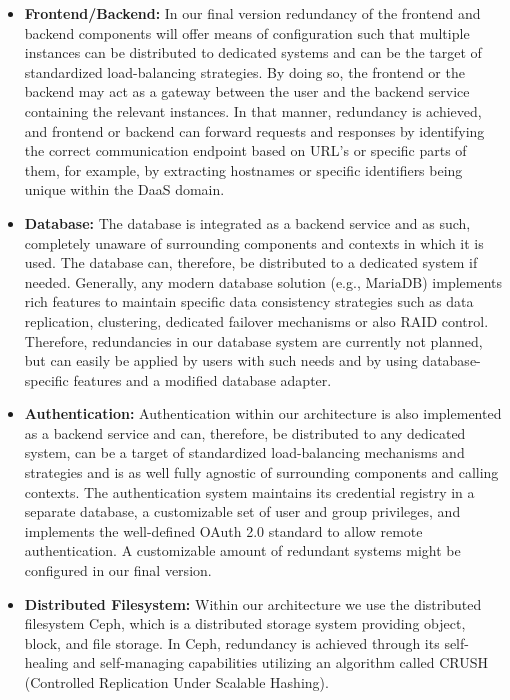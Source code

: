 \documentclass[runningheads]{llncs}
\begin{document}
\begin{itemize}
\item \textbf{Frontend/Backend:} In our final version
redundancy of the frontend and backend components will offer means of configuration
such that multiple instances can be distributed to dedicated systems
and can be the target of standardized load-balancing strategies.
By doing so, the frontend or the backend may act as a gateway
between the user and the backend service containing the relevant instances.
In that manner, redundancy is achieved, and frontend or backend
can forward requests and responses
by identifying the correct communication endpoint
based on URL's or specific parts of them,
for example, by extracting hostnames
or specific identifiers being unique within the DaaS domain.
\item \textbf{Database:} The database is integrated as a backend service
and as such, completely unaware of surrounding components
and contexts in which it is used.
The database can, therefore, be distributed to a dedicated system if needed.
Generally, any modern database solution (e.g., MariaDB) implements rich features
to maintain specific data consistency strategies
such as data replication, clustering,
dedicated failover mechanisms or also RAID control.
Therefore, redundancies in our database system are currently not planned,
but can easily be applied by users with such needs
and by using database-specific features and a modified database adapter.
\item \textbf{Authentication: } Authentication within our architecture
is also implemented as a backend service
and can, therefore, be distributed to any dedicated system,
can be a target of standardized load-balancing mechanisms and strategies
and is as well fully agnostic of surrounding components
and calling contexts.
The authentication system maintains
its credential registry in a separate database,
a customizable set of user and group privileges,
and implements the well-defined OAuth 2.0 standard
to allow remote authentication.
A customizable amount of redundant systems might be configured in our final version.
\item \textbf{Distributed Filesystem:} Within our architecture
we use the distributed filesystem Ceph, which is a distributed storage system
providing object, block, and file storage. In Ceph, redundancy is achieved
through its self-healing and self-managing capabilities utilizing an algorithm
called CRUSH (Controlled Replication Under Scalable Hashing).

\end{itemize}
\end{document}
